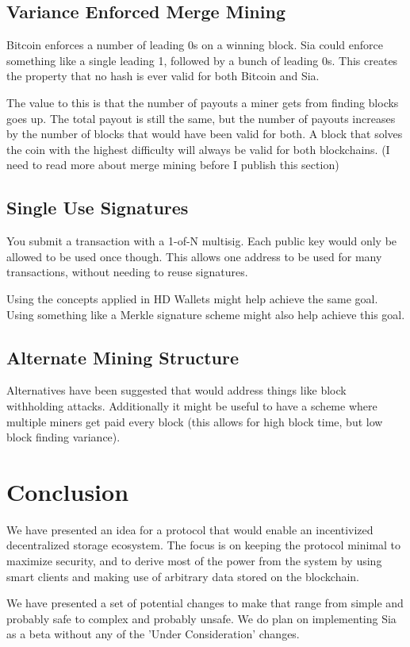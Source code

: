 \documentclass[twocolumn]{article}
\begin{document}
\subsection{Variance Enforced Merge Mining}
Bitcoin enforces a number of leading 0s on a winning block.
Sia could enforce something like a single leading 1, followed by a bunch of leading 0s.
This creates the property that no hash is ever valid for both Bitcoin and Sia.

The value to this is that the number of payouts a miner gets from finding blocks goes up.
The total payout is still the same, but the number of payouts increases by the number of blocks that would have been valid for both.
A block that solves the coin with the highest difficulty will always be valid for both blockchains.
(I need to read more about merge mining before I publish this section)

\subsection{Single Use Signatures}
You submit a transaction with a 1-of-N multisig.
Each public key would only be allowed to be used once though.
This allows one address to be used for many transactions, without needing to reuse signatures.

Using the concepts applied in HD Wallets \cite{hdw} might help achieve the same goal.
Using something like a Merkle signature scheme might also help achieve this goal.

\subsection{Alternate Mining Structure}
Alternatives have been suggested that would address things like block withholding attacks.
Additionally it might be useful to have a scheme where multiple miners get paid every block (this allows for high block time, but low block finding variance).

\section{Conclusion}
We have presented an idea for a protocol that would enable an incentivized decentralized storage ecosystem.
The focus is on keeping the protocol minimal to maximize security, and to derive most of the power from the system by using smart clients and making use of arbitrary data stored on the blockchain.

We have presented a set of potential changes to make that range from simple and probably safe to complex and probably unsafe.
We do plan on implementing Sia as a beta without any of the 'Under Consideration' changes.
\end{document}
